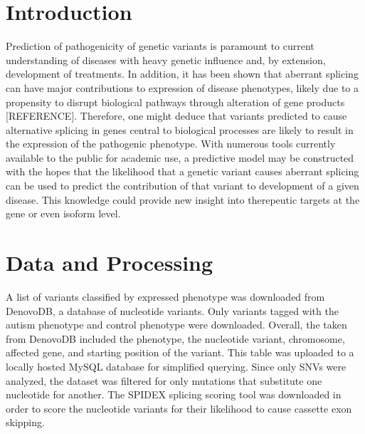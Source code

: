 \documentclass[12pt]{article}
\begin{document}
\section{Introduction}
Prediction of pathogenicity of genetic variants is paramount to current 
understanding of diseases with heavy genetic influence and, by extension,
development of treatments. In addition, it has been shown that aberrant 
splicing can have major contributions to expression of disease phenotypes, 
likely due to a propensity to disrupt biological pathways through alteration 
of gene products [REFERENCE]. Therefore, one might deduce that variants 
predicted to cause alternative splicing in genes central to biological 
processes are likely to result in the expression of the pathogenic phenotype. 
With numerous tools currently available to the public for academic use, a 
predictive model may be constructed with the hopes that the likelihood that a 
genetic variant causes aberrant splicing can be used to predict the contribution 
of that variant to development of a given disease. This knowledge could provide 
new insight into therepeutic targets at the gene or even isoform level.
\iffalse
The major question I wanted to answer was: "Can the likelihood that a single 
nucleotide variant causes cassette exon skipping be used as a predictor
for that nucleotide's potential for pathogenticity?" I hypothesized that 
there is a correlation between an SNV's propensity to cause alternative 
splicing and that variant's pathogenicity probability. The evidence to either 
support or reject my hypothesis was the result of processing scores of 
variants known to be involved in autism spectrum disorder and control variants.
This processing included scoring each variant for the predicted change in
splicing, as well as scoring each variant for a pathogenicity score.
Gene-gene coexpression networks were also constructed to calculate risk scores
for each gene affected by an SNV. Much of the data processing was done with
Python scripts; data management was performed using a local MySQL database.
\fi

\section{Data and Processing}
A list of variants classified by expressed phenotype was downloaded from 
DenovoDB, a database of nucleotide variants. Only variants tagged with the
autism phenotype and control phenotype were downloaded. Overall, the 
taken from DenovoDB included the phenotype, the nucleotide variant, chromosome,
affected gene, and starting position of the variant. This table was uploaded
to a locally hosted MySQL database for simplified querying. Since only SNVs 
were analyzed, the dataset was filtered for only mutations that substitute
one nucleotide for another. The SPIDEX splicing scoring tool was downloaded 
in order to score the nucleotide variants for their likelihood to cause 
cassette exon skipping.
\end{document}
